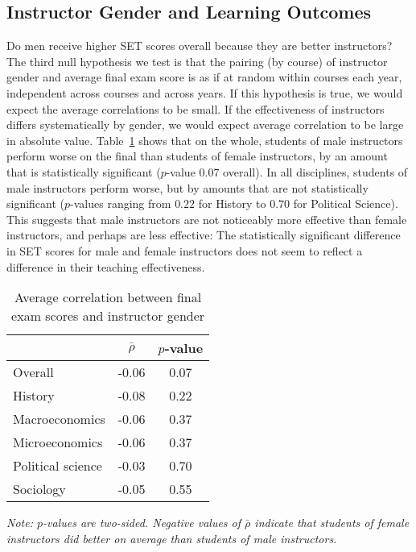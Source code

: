 \documentclass[12pt]{article}
\begin{document}
\subsection{Instructor Gender and Learning Outcomes} \label{sec:Fr-gender-final}
Do men receive higher SET scores overall because they are better instructors? 
The third null hypothesis we test is that the pairing (by course) of instructor gender and
average final exam score is as if at random within courses each year, independent
across courses and across years.
If this hypothesis is true, we would expect the average correlations to be small.
If the effectiveness of instructors differs systematically by gender,
we would expect average correlation to be large in absolute value. 
Table~\ref{tab:genderfinal} shows that on the whole, students of male instructors
perform worse on the final than students of female instructors, by an amount that 
is statistically significant ($p$-value $0.07$ overall).
In all disciplines, students of male instructors perform worse, 
but by amounts that are not statistically significant 
($p$-values ranging from $0.22$ for History to $0.70$ for Political Science).
This suggests that male instructors are not noticeably more effective than 
female instructors, and perhaps are less effective:
The statistically significant difference in SET scores for male and female instructors
does not seem to reflect a difference in their teaching effectiveness.


\begin{table}[htbp]
  \centering
  \footnotesize 
  \caption{Average correlation between final exam scores and instructor gender}
    \begin{tabular}{lcc}
    \toprule 
                     & $\bar{\rho}$  & $p$-value    \\
   \midrule
    Overall &            -0.06       & 0.07      \\
    History &            -0.08       & 0.22      \\
    Macroeconomics &     -0.06       & 0.37      \\
    Microeconomics &     -0.06       & 0.37      \\
    Political science &  -0.03       & 0.70      \\
    Sociology &          -0.05       & 0.55      \\
    \bottomrule
    \end{tabular}%
 \label{tab:genderfinal}%
 
  \textit{Note: $p$-values are two-sided. Negative values of $\bar{\rho}$ indicate
  that students of female instructors did better on average than students of male
  instructors.}
\end{table}%
\normalsize
\end{document}
